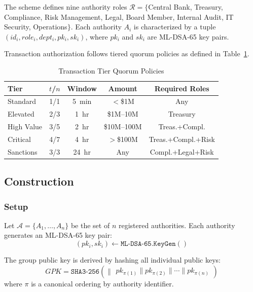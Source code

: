 \documentclass[conference,10pt]{IEEEtran}
\newcommand{\SHA}{\texttt{SHA3-256}}
\begin{document}
The scheme defines nine authority roles $\mathcal{R} = \{$Central Bank, Treasury, Compliance, Risk Management, Legal, Board Member, Internal Audit, IT Security, Operations$\}$. Each authority $A_i$ is characterized by a tuple $(id_i, role_i, dept_i, pk_i, sk_i)$, where $pk_i$ and $sk_i$ are ML-DSA-65 key pairs.

Transaction authorization follows tiered quorum policies as defined in Table~\ref{tab:quorum}.

\begin{table}[htbp]
\centering
\caption{Transaction Tier Quorum Policies}
\label{tab:quorum}
\begin{tabular}{@{}lcccc@{}}
\toprule
\textbf{Tier} & \textbf{$t$/$n$} & \textbf{Window} & \textbf{Amount} & \textbf{Required Roles} \\
\midrule
Standard  & 1/1 & 5~min & $<$\$1M  & Any \\
Elevated  & 2/3 & 1~hr  & \$1M--10M  & Treasury \\
High Value & 3/5 & 2~hr & \$10M--100M & Treas.+Compl. \\
Critical  & 4/7 & 4~hr  & $>$\$100M  & Treas.+Compl.+Risk \\
Sanctions & 3/3 & 24~hr & Any  & Compl.+Legal+Risk \\
\bottomrule
\end{tabular}
\end{table}

\subsection{Construction}

\subsubsection{Setup}
Let $\mathcal{A} = \{A_1, \ldots, A_n\}$ be the set of $n$ registered authorities. Each authority generates an ML-DSA-65 key pair:
\begin{equation}
(pk_i, sk_i) \leftarrow \texttt{ML-DSA-65.KeyGen}()
\end{equation}

The group public key is derived by hashing all individual public keys:
\begin{equation}
GPK = \SHA\!\left(\bigg\| \begin{array}{l} pk_{\pi(1)} \| pk_{\pi(2)} \| \cdots \| pk_{\pi(n)} \end{array}\right)
\end{equation}
where $\pi$ is a canonical ordering by authority identifier.
\end{document}
